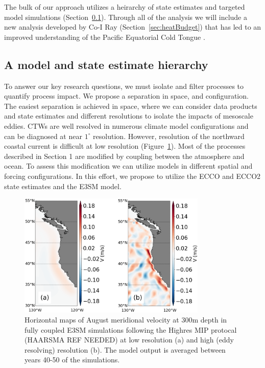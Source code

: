 The bulk of our approach utilizes a heirarchy of state estimates and targeted model simulations (Section~\ref{sec:heirarchy}).  Through all of the analysis we will include a new analysis developed by Co-I Ray (Section~\ref{sec:heatBudget}) that has led to an improved understanding of the Pacific Equatorial Cold Tongue \citep{ray2018understanding}.

\subsection{A model and state estimate hierarchy}
\label{sec:heirarchy}

To answer our key research questions, we must isolate and filter processes to quantify process impact.  We propose a separation in space, and configuration.  The easiest separation is achieved in space, where we can consider data products and state estimates and different resolutions to isolate the impacts of mesoscale eddies.  CTWs are well resolved in numerous climate model configurations and can be diagnosed at near $1^\circ$ resolution.  However, resolution of the northward coastal current is difficult at low resolution (Figure~\ref{fig:E3SM_meridVel}).  Most of the processes described in Section 1 are modified by coupling between the atmosphere and ocean.  To assess this modification we can utilize models in different spatial and forcing configurations.  In this effort, we propose to utilize the ECCO and ECCO2 state estimates and the E3SM model.

\begin{figure}[h]
  \centering
  \includegraphics[width=0.8\textwidth]{e3smmeridcurrent.eps}
  \caption{Horizontal maps of August meridional velocity at 300m depth in fully coupled E3SM simulations following the Highres MIP protocal (HAARSMA REF NEEDED) at low resolution (a) and high (eddy resolving) resolution (b).  The model output is averaged between years 40-50 of the simulations.}
  \label{fig:E3SM_meridVel}
\end{figure}

